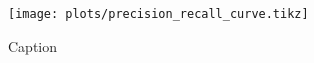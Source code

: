 \documentclass{book}
\newcommand\gratio{0.6180339887}
\begin{document}
\begin{figure}
    \centering
    \texttt{[image: plots/precision\_recall\_curve.tikz]}
    \caption{Caption}
    \label{fig:my_label}
\end{figure}

%
\end{document}
